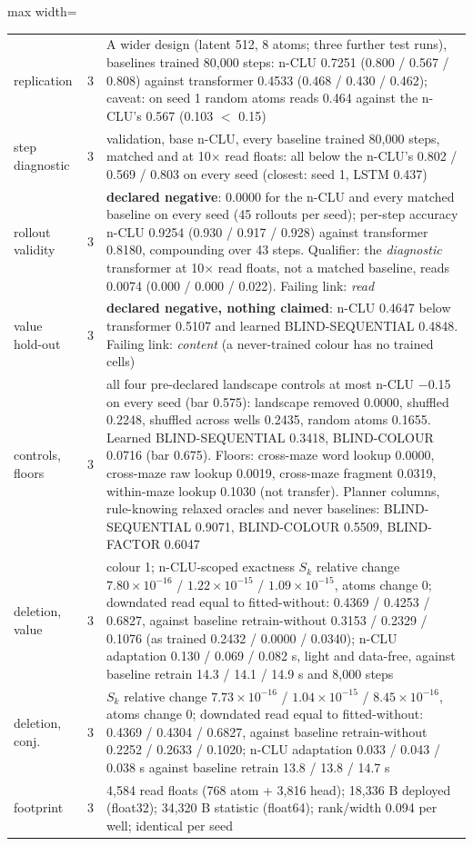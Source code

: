 \documentclass{article} %
\newcommand{\sci}[2]{\ensuremath{#1\times10^{#2}}}
\begin{document}
\begin{table}[h]
\begin{adjustbox}{max width=\linewidth}
\begin{tabular}{p{1.9cm}p{1.2cm}p{10.0cm}}
\quad replication & 3 & A wider design (latent 512, 8 atoms; three further test runs), baselines trained 80,000 steps: n-CLU 0.7251 (0.800 / 0.567 / 0.808) against transformer 0.4533 (0.468 / 0.430 / 0.462); caveat: on seed 1 random atoms reads 0.464 against the n-CLU's 0.567 (0.103 $<$ 0.15) \\
\quad step diagnostic & 3 & validation, base n-CLU, every baseline trained 80,000 steps, matched and at 10$\times$ read floats: all below the n-CLU's 0.802 / 0.569 / 0.803 on every seed (closest: seed 1, LSTM 0.437) \\
rollout validity & 3 & \textbf{declared negative}: 0.0000 for the n-CLU and every matched baseline on every seed (45 rollouts per seed); per-step accuracy n-CLU 0.9254 (0.930 / 0.917 / 0.928) against transformer 0.8180, compounding over 43 steps. Qualifier: the \emph{diagnostic} transformer at 10$\times$ read floats, not a matched baseline, reads 0.0074 (0.000 / 0.000 / 0.022). Failing link: \emph{read} \\
value hold-out & 3 & \textbf{declared negative, nothing claimed}: n-CLU 0.4647 below transformer 0.5107 and learned BLIND-SEQUENTIAL 0.4848. Failing link: \emph{content} (a never-trained colour has no trained cells) \\
controls, floors & 3 & all four pre-declared landscape controls at most n-CLU $-$0.15 on every seed (bar 0.575): landscape removed 0.0000, shuffled 0.2248, shuffled across wells 0.2435, random atoms 0.1655. Learned BLIND-SEQUENTIAL 0.3418, BLIND-COLOUR 0.0716 (bar 0.675). Floors: cross-maze word lookup 0.0000, cross-maze raw lookup 0.0019, cross-maze fragment 0.0319, within-maze lookup 0.1030 (not transfer). Planner columns, rule-knowing relaxed oracles and never baselines: BLIND-SEQUENTIAL 0.9071, BLIND-COLOUR 0.5509, BLIND-FACTOR 0.6047 \\
deletion, value & 3 & colour 1; n-CLU-scoped exactness $S_k$ relative change \sci{7.80}{-16} / \sci{1.22}{-15} / \sci{1.09}{-15}, atoms change 0; downdated read equal to fitted-without: 0.4369 / 0.4253 / 0.6827, against baseline retrain-without 0.3153 / 0.2329 / 0.1076 (as trained 0.2432 / 0.0000 / 0.0340); n-CLU adaptation 0.130 / 0.069 / 0.082 s, light and data-free, against baseline retrain 14.3 / 14.1 / 14.9 s and 8,000 steps \\
deletion, conj. & 3 & $S_k$ relative change \sci{7.73}{-16} / \sci{1.04}{-15} / \sci{8.45}{-16}, atoms change 0; downdated read equal to fitted-without: 0.4369 / 0.4304 / 0.6827, against baseline retrain-without 0.2252 / 0.2633 / 0.1020; n-CLU adaptation 0.033 / 0.043 / 0.038 s against baseline retrain 13.8 / 13.8 / 14.7 s \\
footprint & 3 & 4,584 read floats (768 atom + 3,816 head); 18,336 B deployed (float32); 34,320 B statistic (float64); rank/width 0.094 per well; identical per seed \\
\bottomrule
\end{tabular}\end{adjustbox}
\end{table}
\end{document}

